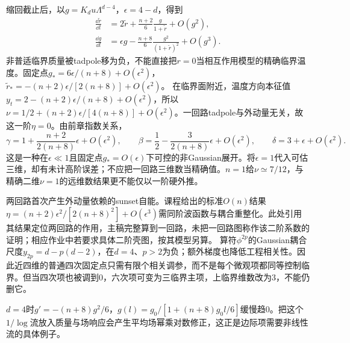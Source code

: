 缩回截止后，以$g=K_du\Lambda^{d-4}$，$\epsilon=4-d$，得到
\begin{align}
\frac{\dd\widetilde r}{\dd l}&=2\widetilde r+\frac{n+2}{6}\frac g{1+\widetilde r}+O(g^2),\\
\frac{\dd g}{\dd l}&=\epsilon g-\frac{n+8}{6}\frac{g^2}{(1+\widetilde r)^2}+O(g^3).
\end{align}
非普适临界质量被tadpole移为负，不能直接把$r=0$当相互作用模型的精确临界温度。固定点$g_*=6\epsilon/(n+8)+O(\epsilon^2)$，$\widetilde r_*=-(n+2)\epsilon/[2(n+8)]+O(\epsilon^2)$。
在临界面附近，温度方向本征值$y_t=2-(n+2)\epsilon/(n+8)+O(\epsilon^2)$，所以$\nu=1/2+(n+2)\epsilon/[4(n+8)]+O(\epsilon^2)$。一回路tadpole与外动量无关，故这一阶$\eta=0$。由前章指数关系，
\begin{equation}
\gamma=1+\frac{n+2}{2(n+8)}\epsilon+O(\epsilon^2),\qquad\beta=\frac12-\frac3{2(n+8)}\epsilon+O(\epsilon^2),\qquad\delta=3+\epsilon+O(\epsilon^2).
\end{equation}
这是一种在$\epsilon\ll1$且固定点$g_*=O(\epsilon)$下可控的非Gaussian展开。将$\epsilon=1$代入可估三维，却有未计高阶误差；不应把一回路三维数当精确值。$n=1$给$\nu\simeq7/12$，与精确二维$\nu=1$的远维数结果更不能仅以一阶硬外推。

两回路首次产生外动量依赖的sunset自能。课程给出的标准$O(n)$结果$\eta=(n+2)\epsilon^2/[2(n+8)^2]+O(\epsilon^3)$需同阶波函数与耦合重整化。此处引用其结果定位两回路的作用，主稿完整算到一回路，未把一回路图称作该二阶系数的证明；相应作业中若要求具体二阶壳图，按其模型另算。
算符$\phi^{2p}$的Gaussian耦合尺度$y_{2p}=d-p(d-2)$，在$d=4$、$p>2$为负；额外梯度也降低工程相关性。因此近四维的普通四次固定点只需有限个相关调参，而不是每个微观项都同等控制临界。但当四次项也被调到0，六次项可变为三临界主项，上临界维数改为3，不能仍删它。

$d=4$时$g'=-(n+8)g^2/6$，$g(l)=g_0/[1+(n+8)g_0l/6]$缓慢趋0。把这个$1/\log$流放入质量与场响应会产生平均场幂乘对数修正，这正是边际项需要非线性流的具体例子。
